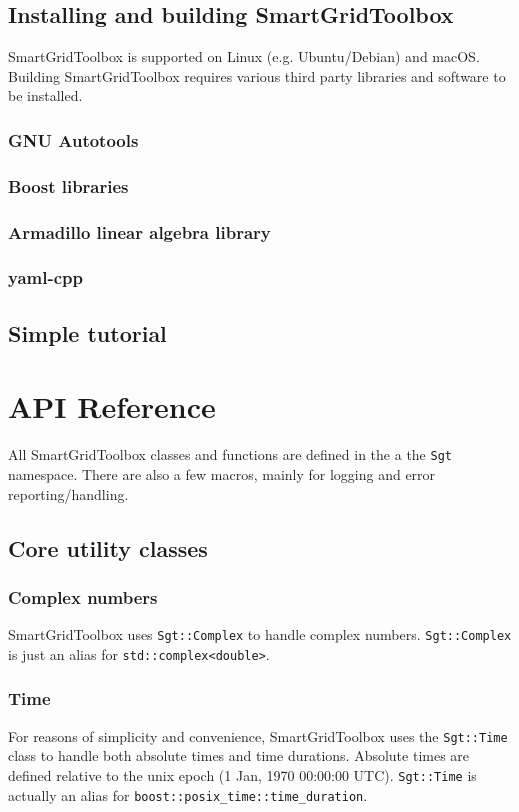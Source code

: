 \documentclass[10pt]{article}
\begin{document}
\subsection{Installing and building SmartGridToolbox}
SmartGridToolbox is supported on Linux (e.g. Ubuntu/Debian) and macOS. Building SmartGridToolbox requires various third party libraries and software to be installed.
\subsubsection{GNU Autotools}
\subsubsection{Boost libraries}
\subsubsection{Armadillo linear algebra library}
\subsubsection{yaml-cpp}

\subsection{Simple tutorial}
\section{API Reference}
All SmartGridToolbox classes and functions are defined in the a the \verb|Sgt| namespace. There are also a few macros, mainly for logging and error reporting/handling.
\subsection{Core utility classes}
\subsubsection{Complex numbers}
SmartGridToolbox uses  \verb|Sgt::Complex| to handle complex numbers. \verb|Sgt::Complex| is just an alias for \verb|std::complex<double>|.
\subsubsection{Time}
For reasons of simplicity and convenience, SmartGridToolbox uses the  \verb|Sgt::Time| class to handle both absolute times and time durations. Absolute times are defined relative to the unix epoch (1 Jan, 1970 00:00:00 UTC). \verb|Sgt::Time| is actually an alias for \verb|boost::posix_time::time_duration|.
\end{document}
